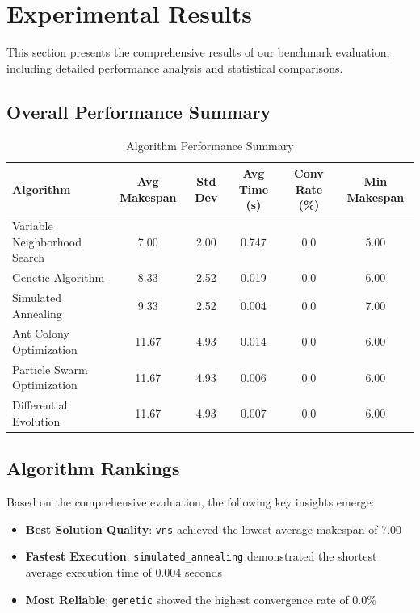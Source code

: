 \documentclass[11pt,a4paper]{article}
\newcommand{\algorithm}[1]{\texttt{#1}}
\begin{document}
\section{Experimental Results}

This section presents the comprehensive results of our benchmark evaluation, including detailed performance analysis and statistical comparisons.

\subsection{Overall Performance Summary}


\begin{table}[H]
\centering
\caption{Algorithm Performance Summary}
\label{tab:performance}
\begin{tabular}{lccccc}
\toprule
Algorithm & Avg Makespan & Std Dev & Avg Time (s) & Conv Rate (\%) & Min Makespan \\
\midrule
Variable Neighborhood Search & 7.00 & 2.00 & 0.747 & 0.0 & 5.00 \\
Genetic Algorithm & 8.33 & 2.52 & 0.019 & 0.0 & 6.00 \\
Simulated Annealing & 9.33 & 2.52 & 0.004 & 0.0 & 7.00 \\
Ant Colony Optimization & 11.67 & 4.93 & 0.014 & 0.0 & 6.00 \\
Particle Swarm Optimization & 11.67 & 4.93 & 0.006 & 0.0 & 6.00 \\
Differential Evolution & 11.67 & 4.93 & 0.007 & 0.0 & 6.00 \\

\bottomrule
\end{tabular}
\end{table}




\subsection{Algorithm Rankings}

Based on the comprehensive evaluation, the following key insights emerge:

\begin{itemize}
    \item \textbf{Best Solution Quality}: \algorithm{vns} achieved the lowest average makespan of 7.00
    \item \textbf{Fastest Execution}: \algorithm{simulated_annealing} demonstrated the shortest average execution time of 0.004 seconds
    \item \textbf{Most Reliable}: \algorithm{genetic} showed the highest convergence rate of 0.0\%
\end{itemize}
\end{document}
